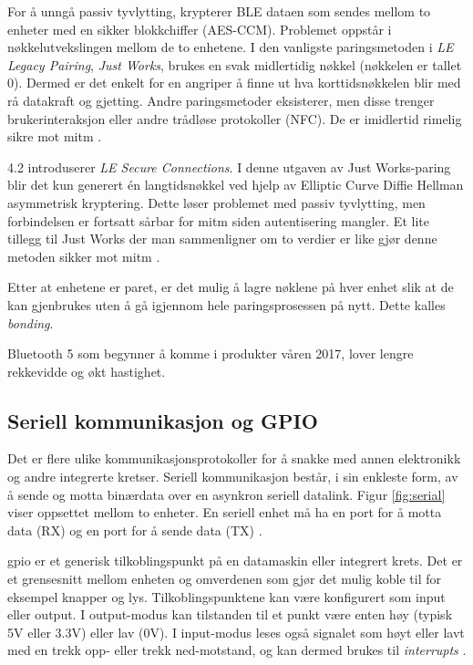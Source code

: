 For å unngå passiv tyvlytting, krypterer BLE dataen som sendes mellom to enheter med en sikker blokkchiffer (AES-CCM). Problemet oppstår
i nøkkelutvekslingen mellom de to enhetene. I den vanligste paringsmetoden i \textit{LE Legacy Pairing}, \textit{Just Works\texttrademark},
brukes en svak midlertidig nøkkel (nøkkelen er tallet 0). Dermed er det enkelt for en angriper å finne ut hva korttidsnøkkelen
blir med rå datakraft og gjetting. Andre paringsmetoder eksisterer, men disse trenger brukerinteraksjon eller andre trådløse protokoller (NFC).
De er imidlertid rimelig sikre mot \gls{mitm} \citep{eewiki_ble}.

4.2 introduserer \textit{LE Secure Connections}. I denne utgaven av Just Works\texttrademark-paring blir det kun generert
én langtidsnøkkel ved hjelp av Elliptic Curve Diffie Hellman asymmetrisk kryptering. Dette løser problemet med passiv
tyvlytting, men forbindelsen er fortsatt sårbar for \gls{mitm} siden autentisering mangler. Et lite tillegg til Just Works\texttrademark
der man sammenligner om to verdier er like gjør denne metoden sikker mot \gls{mitm} \citep{eewiki_ble}.

Etter at enhetene er paret, er det mulig å lagre nøklene på hver enhet slik at de kan gjenbrukes uten å gå igjennom hele
paringsprosessen på nytt. Dette kalles \textit{bonding}.

Bluetooth 5 som begynner å komme i produkter våren 2017, lover lengre rekkevidde og økt hastighet.

\subsection{Seriell kommunikasjon og GPIO}
Det er flere ulike kommunikasjonsprotokoller for å snakke med annen elektronikk og andre integrerte kretser.
Seriell kommunikasjon består, i sin enkleste form, av å sende og motta binærdata over en asynkron seriell datalink.
Figur \ref{fig:serial} viser oppsettet mellom to enheter. En seriell enhet må ha en port for å motta data (RX)
og en port for å sende data (TX) \citep{spark_serial}.

\Gls{gpio} er et generisk tilkoblingspunkt på en datamaskin eller integrert krets. Det er et grensesnitt mellom enheten
og omverdenen som gjør det mulig koble til for eksempel knapper og lys. Tilkoblingspunktene kan være konfigurert som
input eller output. I output-modus kan tilstanden til et punkt være enten høy (typisk 5V eller 3.3V) eller lav (0V).
I input-modus leses også signalet som høyt eller lavt med en trekk opp- eller trekk ned-motstand, og kan dermed
brukes til \textit{interrupts} \citep{gpio_pi}.

